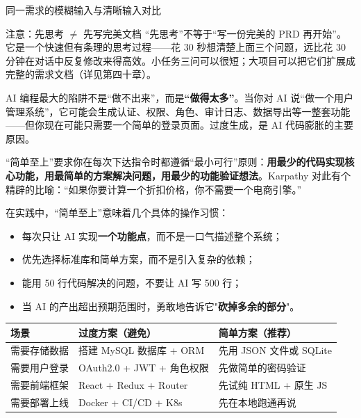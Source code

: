 \begin{center}\small\color{gray}同一需求的模糊输入与清晰输入对比\end{center}

\begin{tcbwarn}{注意：先思考 $\neq$ 先写完美文档}
“先思考”不等于“写一份完美的 PRD 再开始”。它是一个快速但有条理的思考过程——花 30 秒想清楚上面三个问题，远比花 30 分钟在对话中反复修改来得高效。小任务三问可以很短；大项目可以把它们扩展成完整的需求文档（详见第四十章）。

\end{tcbwarn}


AI 编程最大的陷阱不是“做不出来”，而是\textbf{“做得太多”}。当你对 AI 说“做一个用户管理系统”，它可能会生成认证、权限、角色、审计日志、数据导出等一整套功能——但你现在可能只需要一个简单的登录页面。过度生成，是 AI 代码膨胀的主要原因。

“简单至上”要求你在每次下达指令时都遵循“最小可行”原则：\textbf{用最少的代码实现核心功能，用最简单的方案解决问题，用最少的功能验证想法}。Karpathy 对此有个精辟的比喻：“如果你要计算一个折扣价格，你不需要一个电商引擎。”

在实践中，“简单至上”意味着几个具体的操作习惯：

\begin{itemize}
  \item 每次只让 AI 实现\textbf{一个功能点}，而不是一口气描述整个系统；
  \item 优先选择标准库和简单方案，而不是引入复杂的依赖；
  \item 能用 50 行代码解决的问题，不要让 AI 写 500 行；
  \item 当 AI 的产出超出预期范围时，勇敢地告诉它"\textbf{砍掉多余的部分}"。
\end{itemize}

\begin{center}
\begin{tabularx}{\linewidth}{|X|X|X|}
\hline
\textbf{场景} & \textbf{过度方案（避免）} & \textbf{简单方案（推荐）} \tabularnewline
\hline
需要存储数据 & 搭建 MySQL 数据库 + ORM & 先用 JSON 文件或 SQLite \tabularnewline
需要用户登录 & OAuth2.0 + JWT + 角色权限 & 先做简单的密码验证 \tabularnewline
需要前端框架 & React + Redux + Router & 先试纯 HTML + 原生 JS \tabularnewline
需要部署上线 & Docker + CI/CD + K8s & 先在本地跑通再说 \tabularnewline
\hline
\end{tabularx}
\end{center}

